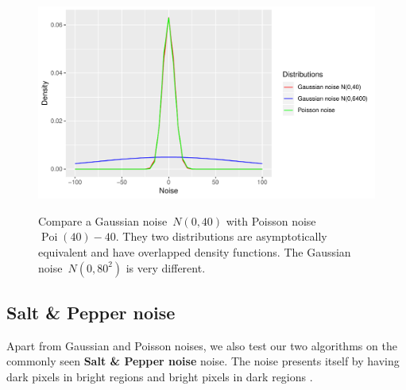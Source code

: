 \begin{figure}
  \centering
  \includegraphics[scale=.8]{noise}\\
  \caption{Compare a Gaussian noise~$N(0,40)$ with Poisson noise $\operatorname{Poi}(40)-40$. They two distributions are asymptotically equivalent and have overlapped density functions. The Gaussian noise~$N(0,80^2)$ is very different.}\label{noise}
\end{figure}

\subsection{Salt \& Pepper noise}
Apart from Gaussian and Poisson noises, we also test our two algorithms on the commonly seen \textbf{Salt \& Pepper noise} noise. The noise presents itself by having dark pixels in bright regions and bright pixels in dark regions \citep{sampat2005computer}.

